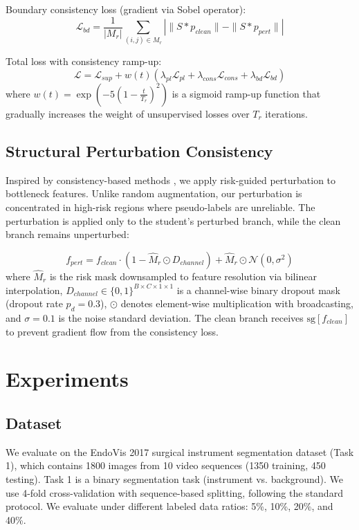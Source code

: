 \documentclass[conference]{IEEEtran}
\begin{document}
Boundary consistency loss (gradient via Sobel operator):
\begin{equation}
\mathcal{L}_{bd} = \frac{1}{|M_r|} \sum_{(i,j) \in M_r} |\|S * p_{clean}\| - \|S * p_{pert}\||
\end{equation}

Total loss with consistency ramp-up:
\begin{equation}
\mathcal{L} = \mathcal{L}_{sup} + w(t) \left( \lambda_{pl}\mathcal{L}_{pl} + \lambda_{cons}\mathcal{L}_{cons} + \lambda_{bd}\mathcal{L}_{bd} \right)
\end{equation}
where $w(t) = \exp\left(-5\left(1 - \frac{t}{T_r}\right)^2\right)$ is a sigmoid ramp-up function that gradually increases the weight of unsupervised losses over $T_r$ iterations.

\subsection{Structural Perturbation Consistency}

Inspired by consistency-based methods \cite{berthelot2019mixmatch}, we apply risk-guided perturbation to bottleneck features. Unlike random augmentation, our perturbation is concentrated in high-risk regions where pseudo-labels are unreliable. The perturbation is applied only to the student's perturbed branch, while the clean branch remains unperturbed:

\begin{equation}
f_{pert} = f_{clean} \cdot (1 - \hat{M}_r \odot D_{channel}) + \hat{M}_r \odot \mathcal{N}(0, \sigma^2)
\end{equation}
where $\hat{M}_r$ is the risk mask downsampled to feature resolution via bilinear interpolation, $D_{channel} \in \{0,1\}^{B \times C \times 1 \times 1}$ is a channel-wise binary dropout mask (dropout rate $p_d=0.3$), $\odot$ denotes element-wise multiplication with broadcasting, and $\sigma=0.1$ is the noise standard deviation. The clean branch receives $\text{sg}[f_{clean}]$ to prevent gradient flow from the consistency loss.

\section{Experiments}

\subsection{Dataset}
We evaluate on the EndoVis 2017 \cite{allan20192017} surgical instrument segmentation dataset (Task 1), which contains 1800 images from 10 video sequences (1350 training, 450 testing). Task 1 is a binary segmentation task (instrument vs. background). We use 4-fold cross-validation with sequence-based splitting, following the standard protocol. We evaluate under different labeled data ratios: 5\%, 10\%, 20\%, and 40\%.
\end{document}
